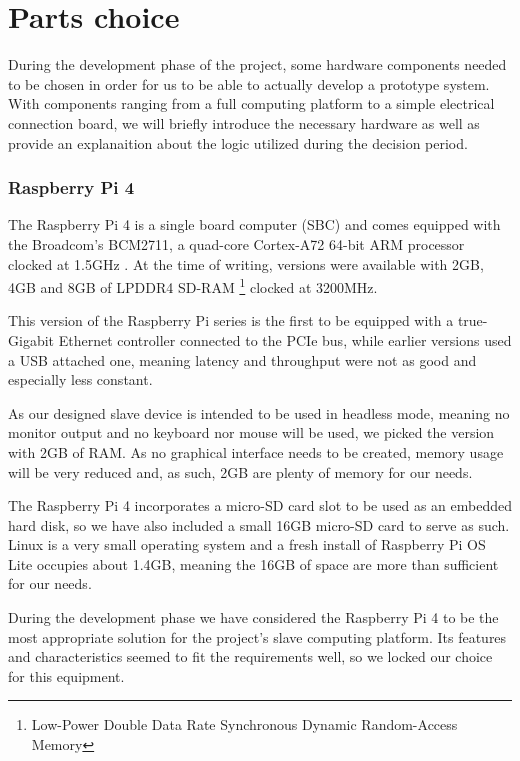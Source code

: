 \section{Parts choice} \label{sec:parts_choice}
During the development phase of the project, some hardware components needed to be chosen in order for us to be able to actually develop a prototype system.
With components ranging from a full computing platform to a simple electrical connection board, we will briefly introduce the necessary hardware as well as provide an explanaition about the logic utilized during the decision period.


\subsubsection{Raspberry Pi 4}
The Raspberry Pi 4 is a single board computer (SBC) and comes equipped with the Broadcom's BCM2711, a quad-core Cortex-A72 64-bit ARM processor clocked at 1.5GHz \cite{technology:rpi4-specs}.
At the time of writing, versions were available with 2GB, 4GB and 8GB of LPDDR4 SD-RAM \footnote{Low-Power Double Data Rate Synchronous Dynamic Random-Access Memory} clocked at 3200MHz.

This version of the Raspberry Pi series is the first to be equipped with a true-Gigabit Ethernet controller connected to the PCIe bus, while earlier versions used a USB attached one, meaning latency and throughput were not as good and especially less constant.

As our designed slave device is intended to be used in headless mode, meaning no monitor output and no keyboard nor mouse will be used, we picked the version with 2GB of RAM.
As no graphical interface needs to be created, memory usage will be very reduced and, as such, 2GB are plenty of memory for our needs.

The Raspberry Pi 4 incorporates a micro-SD card slot to be used as an embedded hard disk, so we have also included a small 16GB micro-SD card to serve as such.
Linux is a very small operating system and a fresh install of Raspberry Pi OS Lite occupies about 1.4GB, meaning the 16GB of space are more than sufficient for our needs.

During the development phase we have considered the Raspberry Pi 4 to be the most appropriate solution for the project's slave computing platform.
Its features and characteristics seemed to fit the requirements well, so we locked our choice for this equipment.

